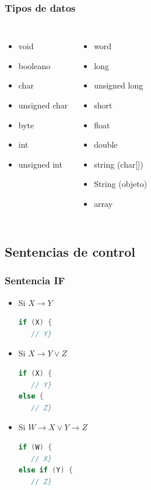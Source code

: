 \documentclass{beamer}
\begin{document}
\begin{frame}
\frametitle{Tipos de datos}
\begin{columns}[c]
\begin{itemize}
\item void
\item booleano
\item char
\item unsigned char
\item byte
\item int
\item unsigned int
\end{itemize}
\begin{itemize}
\item word
\item long
\item unsigned long
\item short
\item float
\item double
\item string (char[])
\item String (objeto)
\item array
\end{itemize}
\end{columns}
\end{frame}

\subsection{Sentencias de control}

\begin{frame}[fragile]
\frametitle{Sentencia IF}
\begin{itemize}
\item Si $X \longrightarrow Y$
\begin{lstlisting}[language=java]
if (X) {
   // Y}
\end{lstlisting}

\item Si $X \longrightarrow Y \vee Z$
\begin{lstlisting}[language=java]
if (X) {
   // Y}
else {
   // Z}
\end{lstlisting}

\item Si $W \longrightarrow X \vee Y \longrightarrow Z$
\begin{lstlisting}[language=java]
if (W) {
   // X}
else if (Y) {
   // Z}
\end{lstlisting}
\end{itemize}
\end{frame}
\end{document}
